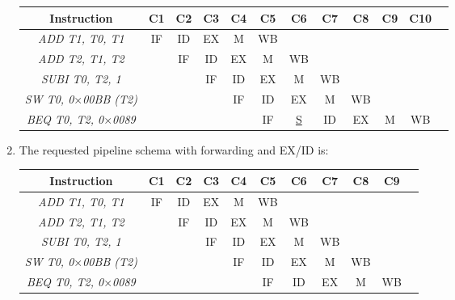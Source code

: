 \begin{enumerate}
\begin{table}[H]
\begin{tabular}{c|ccccccccccc}
            \textbf{Instruction}          & \textbf{C1} & \textbf{C2} & \textbf{C3} & \textbf{C4} & \textbf{C5} & \textbf{C6} & \textbf{C7} & \textbf{C8} & \textbf{C9} & \textbf{C10} \\ \hline
            \textit{ADD T1, T0, T1}   & IF          & ID          & EX          & M           & WB          &             &             &             &             &              \\ 
            \textit{ADD T2, T1, T2}   &             & IF          & ID          & EX          & M           & WB          &             &             &             &              \\ 
            \textit{SUBI T0, T2, 1}     &             &             & IF          & ID          & EX          & M           & WB          &             &             &              \\ 
            \textit{SW T0, 0$\times$00BB (T2)}  &             &             &             & IF          & ID          & EX          & M           & WB          &             &              \\ 
            \textit{BEQ T0, T2, 0$\times$0089} &             &             &             &             & IF          & \underline{S}      & ID          & EX          & M           & WB           \\ 
            \end{tabular}
        \end{table}
    \item The requested pipeline schema with forwarding and EX/ID is:
        \begin{table}[H]
            \centering
            \begin{tabular}{c|cccccccccc}
            \textbf{Instruction}          & \textbf{C1} & \textbf{C2} & \textbf{C3} & \textbf{C4} & \textbf{C5} & \textbf{C6} & \textbf{C7} & \textbf{C8} & \textbf{C9} \\ \hline
            \textit{ADD T1, T0, T1}   & IF          & ID          & EX          & M           & WB          &             &             &             &             \\ 
            \textit{ADD T2, T1, T2}   &             & IF          & ID          & EX          & M           & WB          &             &             &             \\ 
            \textit{SUBI T0, T2, 1}     &             &             & IF          & ID          & EX          & M           & WB          &             &             \\ 
            \textit{SW T0, 0$\times$00BB (T2)}  &             &             &             & IF          & ID          & EX          & M           & WB          &             \\ 
            \textit{BEQ T0, T2, 0$\times$0089} &             &             &             &             & IF          & ID          & EX          & M           & WB          \\ 
            \end{tabular}
        \end{table}
\end{enumerate}
